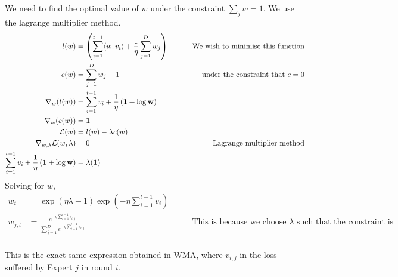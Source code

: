 \documentclass{article}
\begin{document}
We need to find the optimal value of $w$ under the constraint $\sum_j w = 1$. We use the lagrange multiplier method.
\begin{align*}
    l(w) &= \left( \sum_{i=1}^{t-1} \langle w,v_i \rangle + \frac{1}{\eta} \sum_{j=1}^{D} w_j \right)\ &\qquad \text{We wish to minimise this function}\\
    c(w) &= \sum_{j=1}^{D} w_j - 1 &\qquad \text{under the constraint that $c=0$}\\
    \nabla_w(l(w)) &=\sum_{i=1}^{t-1} v_i + \frac{1}{\eta}\left( \bf{1} + \log w \right) \\
    \nabla_w(c(w)) &= \bf{1}\\
    \mathcal{L}(w) &= l(w) - \lambda c(w) \\
    \nabla_{w,\lambda}\mathcal{L}(w,\lambda) &= 0  &\qquad \text{Lagrange multiplier method}\\
    \sum_{i=1}^{t-1} v_i + \frac{1}{\eta}\left( \bf{1} + \log w \right) &= \lambda(\bf{1})
\end{align*}
Solving for $w$,
\begin{align*}
    w_t &= \exp (\eta \lambda - 1) \exp (-\eta \sum_{i=1}^{t-1}v_i)\\
    w_{j,t}    &= \frac{e^{-\eta \sum_{i=1}^{t-1}v_{i,j}}}{\sum_{j=1}^{D}e^{-\eta \sum_{i=1}^{t-1}v_{i,j}}} &\qquad \text{This is because we choose $\lambda$ such that the constraint is satisfied}\\
\end{align*}

This is the exact same expression obtained in WMA, where $v_{i,j}$ in the loss suffered by Expert $j$ in round $i$.

\newpage
\end{document}
